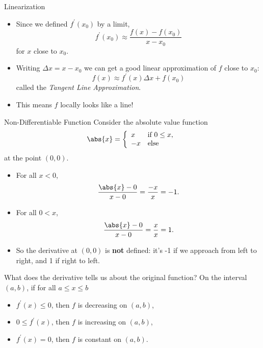 \documentclass{beamer}
\theoremstyle{definition}
\begin{document}
\begin{frame}{Linearization}
  \begin{itemize}
    \item<1->
      Since we defined $f^\prime(x_0)$ by a limit, 
      $$f^\prime(x_0) \approx \frac{f(x) - f(x_0)}{x - x_0}$$
      for $x$ close to $x_0$.
    \item<2->
      Writing $\Delta x = x - x_0$ we can get a good linear approximation of $f$ close to $x_0$:
      $$f(x) \approx f^\prime(x)\Delta x + f(x_0)$$
      called the {\it Tangent Line Approximation}.
    \item<3->
      This means $f$ locally looks like a line!
  \end{itemize}
\end{frame}

\begin{frame}{Non-Differentiable Function}
  Consider the absolute value function
  $$\abs{x} = \left\{\begin{array}{ll}x & \text{if}\ 0 \leq x,\\-x & \text{else}\end{array} \right.$$
  at the point $(0,0)$.
  \begin{itemize}
    \item<2->
      For all $x < 0$, 
      $$\frac{\abs{x} - 0}{x - 0} = \frac{-x}{x} = -1.$$
    \item<3->
      For all $0 < x$,
      $$\frac{\abs{x} - 0}{x - 0} = \frac{x}{x} = 1.$$
    \item<4->
      So the derivative at $(0,0)$ is {\bf not} defined: it's -1 if we approach from left to right, and 1 if right to left.
  \end{itemize}
\end{frame}

\begin{frame}
  What does the derivative tells us about the original function?
  On the interval $(a,b)$, if for all $a \leq x \leq b$
  \begin{itemize}
  \item<2->
    $f^\prime(x) \leq 0$, then $f$ is decreasing on $(a,b)$,
  \item<3->
    $0 \leq f^\prime(x)$, then $f$ is increasing on $(a,b)$,
  \item<4->
    $f^\prime(x) = 0$, then $f$ is constant on $(a,b)$.
  \end{itemize}
\end{frame}
\end{document}
